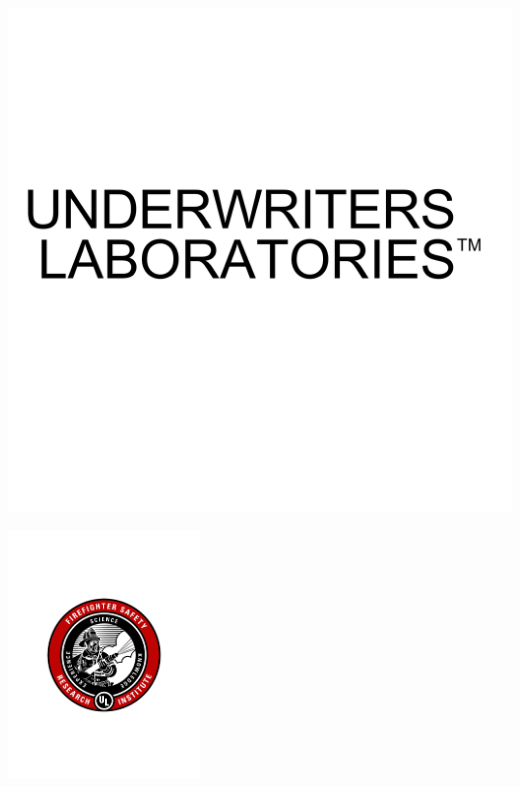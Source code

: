 \documentclass[12pt,oneside]{book}
\begin{document}
\begin{minipage}[t][9in][s]{6.25in}
\begin{flushright}
\begin{minipage}{0.5\textwidth}
\includegraphics[width=\textwidth]{UnderwritersLaboratories_TM} \\ 
\end{minipage} \hfill
\begin{minipage}{0.25\textwidth}
\includegraphics[width=2.0in]{FSRI_GraphicShield} \\ 
\end{minipage}
\end{flushright}

\scriptsize
{}
\end{minipage}
\end{document}
